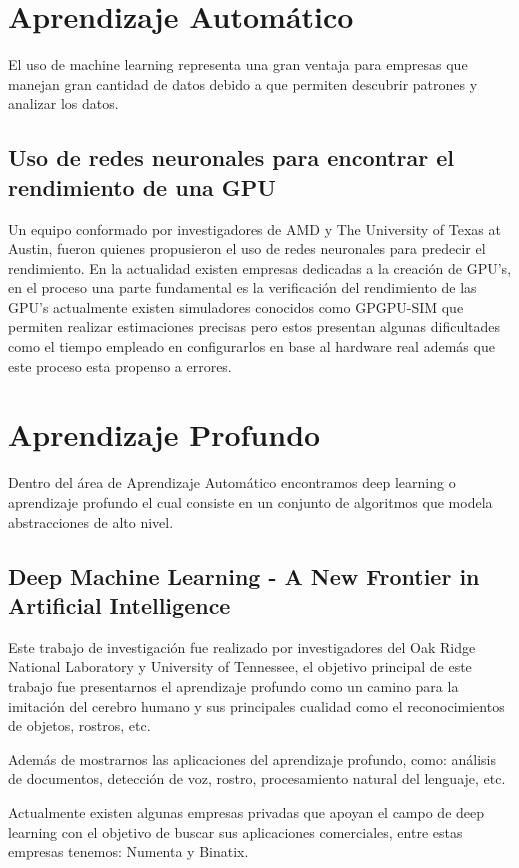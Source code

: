 \section{Aprendizaje Automático}
El uso de machine learning representa una gran ventaja para empresas que manejan gran cantidad de datos debido a que permiten descubrir patrones y analizar los datos.

\subsection{Uso de redes neuronales para encontrar el rendimiento de una GPU}
Un equipo conformado por investigadores de AMD y The University of Texas at Austin, fueron quienes propusieron el uso de redes neuronales para predecir el rendimiento.
En la actualidad existen empresas dedicadas a la creación de GPU's, en el proceso una parte fundamental es la verificación del rendimiento de las GPU's actualmente existen simuladores conocidos como GPGPU-SIM que permiten realizar estimaciones precisas pero estos presentan algunas dificultades como el tiempo empleado en configurarlos en base al hardware real además que este proceso esta propenso a errores. 
\section{Aprendizaje Profundo}
Dentro del área de Aprendizaje Automático encontramos deep learning o aprendizaje profundo el cual consiste en un conjunto de algoritmos que modela abstracciones de alto nivel.

\subsection{Deep Machine Learning - A New Frontier in Artificial Intelligence}
Este trabajo de investigación fue realizado por investigadores del Oak Ridge National Laboratory y University of Tennessee, el objetivo principal de este trabajo fue presentarnos el aprendizaje profundo como un camino para la imitación del cerebro humano y sus principales cualidad como el reconocimientos de objetos, rostros, etc.

Además de mostrarnos las aplicaciones del aprendizaje profundo, como: análisis de documentos, detección de voz, rostro, procesamiento natural del lenguaje, etc.

Actualmente existen algunas empresas privadas que apoyan el campo de deep learning con el objetivo de buscar sus aplicaciones comerciales, entre estas empresas tenemos: Numenta y Binatix.
